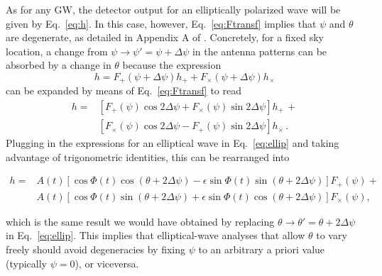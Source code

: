 \documentclass[aps,prd,twocolumn,superscriptaddress,preprintnumbers,floatfix,nofootinbib]{revtex4-2}
\newcommand{\beq}{\begin{equation}}
\newcommand{\eeq}{\end{equation}}
\newcommand*{\eq}[1]{Eq.~\eqref{eq:#1}}
\begin{document}
As for any GW, the detector output for an elliptically polarized wave will be given by \eq{h}.
In this case, however, \eq{Ftransf} implies that $\psi$ and $\theta$ are degenerate, as detailed in Appendix A of \cite{Isi:2017equ}.
Concretely, for a fixed sky location, a change from $\psi \to \psi' = \psi + \Delta\psi$ in the antenna patterns can be absorbed by a change in $\theta$ because the expression
\beq
h = F_+(\psi + \Delta \psi) h_+ + F_\times(\psi + \Delta \psi) h_\times 
\eeq
can be expanded by means of \eq{Ftransf} to read
\begin{align}
h = &\left[ F_+(\psi) \cos 2\Delta\psi + F_\times(\psi) \sin 2\Delta\psi \right] h_+\, + \\
 &\left[F_\times(\psi) \cos 2\Delta\psi - F_+(\psi)\sin 2\Delta\psi\right] h_\times \, .
\end{align}
Plugging in the expressions for an elliptical wave in \eq{ellip} and taking advantage of trigonometric identities, this can be rearranged into
\begin{widetext}
\begin{align} \label{eq:theta_psi}
h = & A(t) \left[\cos \Phi(t) \cos(\theta + 2\Delta\psi) -  \epsilon \sin \Phi(t)\sin(\theta + 2\Delta\psi) \right] F_+(\psi) +\nonumber\\
&A(t) \left[\cos \Phi(t) \sin(\theta + 2\Delta\psi) + \epsilon \sin \Phi(t) \cos(\theta + 2\Delta\psi) \right] F_\times(\psi), 
\end{align}
\end{widetext}
which is the same result we would have obtained by replacing $\theta \to \theta' = \theta + 2 \Delta\psi$ in \eq{ellip}.
This implies that elliptical-wave analyses that allow $\theta$ to vary freely should avoid degeneracies by fixing $\psi$ to an arbitrary a priori value (typically $\psi=0$), or viceversa.


\end{document}

